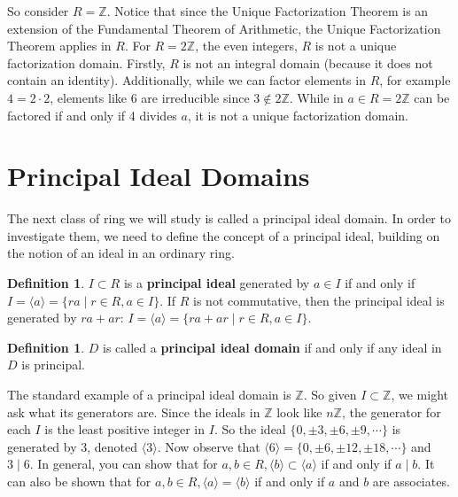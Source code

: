 \documentclass[11pt]{amsart}
\theoremstyle{definition}
\newtheorem{definition}[theorem]{Definition}
\newcommand{\integers}{\mathbb{Z}}
\begin{document}
So consider $R = \integers$. Notice that since the Unique Factorization Theorem is an extension of the Fundamental Theorem of Arithmetic,
the Unique Factorization Theorem applies in $R$. For $R = 2\integers$, the even integers, $R$ is not a unique factorization domain. Firstly, $R$
is not an integral domain (because it does not contain an identity). Additionally, while we can factor elements in $R$, for example $4 = 2 \cdot 2$, 
elements like 6 are irreducible since $3 \notin 2\integers$. While in $a \in R = 2\integers$ can be factored if and only if 4 divides $a$, it is not a
unique factorization domain.
\newpage

\section{Principal Ideal Domains}
The next class of ring we will study is called a principal ideal domain. In order to investigate them, we need to define the concept of a principal
ideal, building on the notion of an ideal in an ordinary ring.
\begin{definition}
	$I \subset R$ is a \textbf{principal ideal} generated by $a \in I$ if and only if $I = \langle a \rangle = \{ ra \mid r \in R, a \in I \}$.
	If $R$ is not commutative, then the principal ideal is generated by $ra + ar$: $I = \langle a \rangle = \{ ra + ar \mid r \in R, a \in I \}$.
\end{definition}
\begin{definition}
	$D$ is called a \textbf{principal ideal domain} if and only if any ideal in $D$ is principal.
\end{definition}

The standard example of a principal ideal domain is $\integers$. So given $I \subset \integers$, we might ask what its generators are. Since the
ideals in $\integers$ look like $n\integers$, the generator for each $I$ is the least positive integer in $I$. So the ideal 
$\{ 0, \pm3, \pm6, \pm9, \cdots \}$ is generated by 3, denoted $\langle 3 \rangle$. Now observe that 
$\langle 6 \rangle = \{ 0, \pm6, \pm12, \pm18, \cdots \}$ and $3 \mid 6$. In general, you can show that for 
$a, b \in R, \langle b \rangle \subset \langle a \rangle$ if and only if $a \mid b$. It can also be shown that for 
$a, b \in R, \langle a \rangle = \langle b \rangle$ if and only if $a$ and $b$ are associates.
\end{document}
